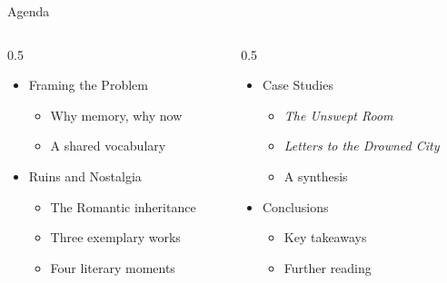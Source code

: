 \documentclass[aspectratio=169]{beamer}
\begin{document}
\begin{frame}{Agenda}
\begin{columns}[T]
\begin{column}{0.5\textwidth}
\begin{itemize}
  \item[\textcolor{dustyrose}{I.}] Framing the Problem
  \begin{itemize}
    \item[\textcolor{sage}{--}] Why memory, why now
    \item[\textcolor{sage}{--}] A shared vocabulary
  \end{itemize}
  \item[\textcolor{dustyrose}{II.}] Ruins and Nostalgia
  \begin{itemize}
    \item[\textcolor{sage}{--}] The Romantic inheritance
    \item[\textcolor{sage}{--}] Three exemplary works
    \item[\textcolor{sage}{--}] Four literary moments
  \end{itemize}
\end{itemize}
\end{column}
\begin{column}{0.5\textwidth}
\begin{itemize}
  \item[\textcolor{dustyrose}{III.}] Case Studies
  \begin{itemize}
    \item[\textcolor{sage}{--}] \textit{The Unswept Room}
    \item[\textcolor{sage}{--}] \textit{Letters to the Drowned City}
    \item[\textcolor{sage}{--}] A synthesis
  \end{itemize}
  \item[\textcolor{dustyrose}{IV.}] Conclusions
  \begin{itemize}
    \item[\textcolor{sage}{--}] Key takeaways
    \item[\textcolor{sage}{--}] Further reading
  \end{itemize}
\end{itemize}
\end{column}
\end{columns}
\end{frame}

\end{document}
